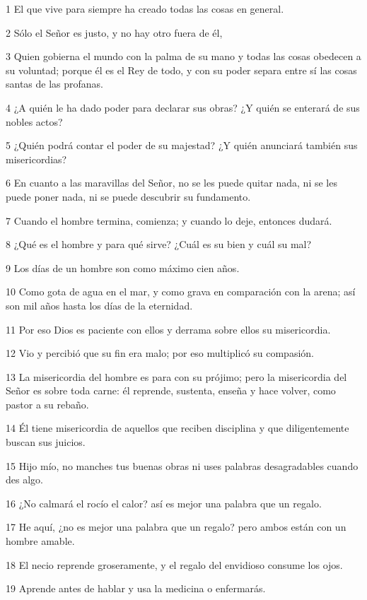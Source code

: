 \par 1 El que vive para siempre ha creado todas las cosas en general.
\par 2 Sólo el Señor es justo, y no hay otro fuera de él,
\par 3 Quien gobierna el mundo con la palma de su mano y todas las cosas obedecen a su voluntad; porque él es el Rey de todo, y con su poder separa entre sí las cosas santas de las profanas.
\par 4 ¿A quién le ha dado poder para declarar sus obras? ¿Y quién se enterará de sus nobles actos?
\par 5 ¿Quién podrá contar el poder de su majestad? ¿Y quién anunciará también sus misericordias?
\par 6 En cuanto a las maravillas del Señor, no se les puede quitar nada, ni se les puede poner nada, ni se puede descubrir su fundamento.
\par 7 Cuando el hombre termina, comienza; y cuando lo deje, entonces dudará.
\par 8 ¿Qué es el hombre y para qué sirve? ¿Cuál es su bien y cuál su mal?
\par 9 Los días de un hombre son como máximo cien años.
\par 10 Como gota de agua en el mar, y como grava en comparación con la arena; así son mil años hasta los días de la eternidad.
\par 11 Por eso Dios es paciente con ellos y derrama sobre ellos su misericordia.
\par 12 Vio y percibió que su fin era malo; por eso multiplicó su compasión.
\par 13 La misericordia del hombre es para con su prójimo; pero la misericordia del Señor es sobre toda carne: él reprende, sustenta, enseña y hace volver, como pastor a su rebaño.
\par 14 Él tiene misericordia de aquellos que reciben disciplina y que diligentemente buscan sus juicios.
\par 15 Hijo mío, no manches tus buenas obras ni uses palabras desagradables cuando des algo.
\par 16 ¿No calmará el rocío el calor? así es mejor una palabra que un regalo.
\par 17 He aquí, ¿no es mejor una palabra que un regalo? pero ambos están con un hombre amable.
\par 18 El necio reprende groseramente, y el regalo del envidioso consume los ojos.
\par 19 Aprende antes de hablar y usa la medicina o enfermarás.
